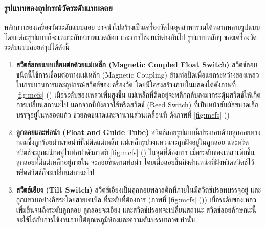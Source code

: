 \documentclass[final,11pt,a4paper]{article}
\begin{document}
\subsubsection{รูปแบบของอุปกรณ์วัดระดับแบบลอย}
หลักการของเครื่องวัดระดับแบบลอย อาจนำไปสร้างเป็นเครื่องวัดในอุตสาหกรรมได้หลากหลายรูปแบบ โดยแต่ละรูปแบบก็จะเหมาะกับสภาพแวดล้อม 
และการใช้งานที่ต่างกันไป รูปแบบหลักๆ ของเครื่องวัดระดับแบบลอยสรุปได้ดังนี้
\begin{enumerate}
    \item \textbf{สวิตช์ลอยแบบเชื่อมต่อด้วยแม่เหล็ก (Magnetic Coupled Float Switch)} สวิตช์ลอยชนิดนี้ใช้การเชื่อมต่อทางแม่เหล็ก (Magnetic Coupling)
    ข้ามท่อปิดเพื่อแยกระหว่างของเหลวในกระบวนการและอุปกรณ์สวิตช์ของเครื่องวัด โดยมีโครงสร้างภายในแสดงได้ดังภาพที่  \ref{fig:mcfs} ()
    เมื่อระดับของเหลวเพิ่มสูงขึ้น  แม่เหล็กที่ติดอยู่จะพลิกกลับลงมากระตุ้นสวิตช์ให้เกิดการเปลี่ยนสถานะไป นอกจากนี้ยังอาจใช้หรีดสวิตช์ (Reed Switch) ที่เป็นหน้าสัมผัสขนาดเล็กบรรจุอยู่ในหลอดแก้ว 
    ช่วยลดขนาดและจำนวนส่วนเคลื่อนที่ ดังภาพที่ \ref{fig:mcfs} ()
    \item \textbf{ลูกลอยและท่อนำ (Float and Guide Tube)} สวิตช์ลอยรูปแบบนี้ประกอบด้วยลูกลอยทรงกลมซึ่งถูกร้อยผ่านท่อนำที่ไม่ติดแม่เหล็ก
    แม่เหล็กรูปวงแหวนจะถูกฝังอยู่ในลูกลอย และหรีดสวิตช์จะถูกผนึกอยู่ในท่อนำดังภาพที่ \ref{fig:mcfs} () ในจุดที่ต้องการ เมื่อระดับของเหลวเพิ่มขึ้น ลูกลอยที่มีแม่เหล็กอยู่ภายใน
    จะลอยขึ้นตามท่อนำ โดยเมื่อลอยขึ้นถึงตำแหน่งที่ฝังหรีดสวิตช์ไว้ หรีดสวิตช์ก็จะเปลี่ยนสถานะไป
    \item \textbf{สวิตช์เอียง (Tilt Switch)} สวิตช์เอียงเป็นลูกลอยพลาสติกที่ภายในมีสวิตช์ปรอทบรรจุอยู่ และถูกแขวนอย่างอิสระโดยสายเคเบิล 
    ที่ระดับที่ต้องการ (ภาพที่ \ref{fig:mcfs} ()) เมื่อระดับของเหลวเพิ่มขึ้นจนถึงระดับลูกลอย ลูกลอยจะเอียง และสวิตช์ปรอทจะเปลี่ยนสถานะ 
    สวิตช์ลอยลักษณะนี้จะใช้ได้กับการใช้งานภายใต้อุณหภูมิห้องและความดันบรรยากาศเท่านั้น
\end{enumerate}
\end{document}
